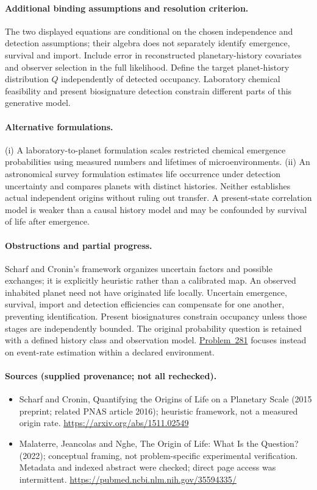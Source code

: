 \documentclass[11pt]{article}
\begin{document}
\paragraph{Additional binding assumptions and resolution criterion.} The two displayed equations are conditional on the chosen independence and detection assumptions; their algebra does not separately identify emergence, survival and import. Include error in reconstructed planetary-history covariates and observer selection in the full likelihood. Define the target planet-history distribution $Q$ independently of detected occupancy. Laboratory chemical feasibility and present biosignature detection constrain different parts of this generative model.

\paragraph{Alternative formulations.} (i) A laboratory-to-planet formulation scales restricted chemical emergence probabilities using measured numbers and lifetimes of microenvironments. (ii) An astronomical survey formulation estimates life occurrence under detection uncertainty and compares planets with distinct histories. Neither establishes actual independent origins without ruling out transfer. A present-state correlation model is weaker than a causal history model and may be confounded by survival of life after emergence.

\paragraph{Obstructions and partial progress.} Scharf and Cronin's framework organizes uncertain factors and possible exchanges; it is explicitly heuristic rather than a calibrated map. An observed inhabited planet need not have originated life locally. Uncertain emergence, survival, import and detection efficiencies can compensate for one another, preventing identification. Present biosignatures constrain occupancy unless those stages are independently bounded. The original probability question is retained with a defined history class and observation model. \href{https://we-solve.github.io/problems/abiogenesis-hazard-under-observer-selection-1ef6bb42/}{Problem~281} focuses instead on event-rate estimation within a declared environment.

\paragraph{Sources (supplied provenance; not all rechecked).} \begin{itemize}
\item Scharf and Cronin, Quantifying the Origins of Life on a Planetary Scale (2015 preprint; related PNAS article 2016); heuristic framework, not a measured origin rate. \url{https://arxiv.org/abs/1511.02549}
\item Malaterre, Jeancolas and Nghe, The Origin of Life: What Is the Question? (2022); conceptual framing, not problem-specific experimental verification. Metadata and indexed abstract were checked; direct page access was intermittent. \url{https://pubmed.ncbi.nlm.nih.gov/35594335/}
\end{itemize}
\end{document}
